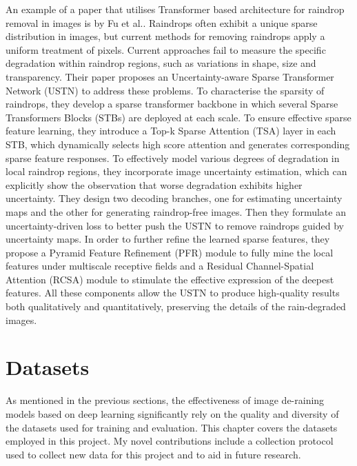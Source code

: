 \documentclass[11pt]{ociamthesis}  %
\begin{document}
An example of a paper that utilises Transformer based architecture for raindrop removal in images is by Fu et al.\cite{fu2024uncertainty}. Raindrops often exhibit a unique sparse distribution in images, but current methods for removing raindrops apply a uniform treatment of pixels. Current approaches fail to measure the specific degradation within raindrop regions, such as variations in shape, size and transparency. Their paper proposes an Uncertainty-aware Sparse Transformer Network (USTN) to address these problems. To characterise the sparsity of raindrops, they develop a sparse transformer backbone in which several Sparse Transformers Blocks\cite{child2019generatinglongsequencessparse} (STBs) are deployed at each scale. To ensure effective sparse feature learning, they introduce a Top-k Sparse Attention (TSA) layer in each STB, which dynamically selects high score attention and generates corresponding sparse feature responses. To effectively model various degrees of degradation in local raindrop regions, they incorporate image uncertainty estimation, which can explicitly show the observation that worse degradation exhibits higher uncertainty. They design two decoding branches, one for estimating uncertainty maps and the other for generating raindrop-free images. Then they formulate an uncertainty-driven loss to better push the USTN to remove raindrops guided by uncertainty maps. In order to further refine the learned sparse features, they propose a Pyramid Feature Refinement (PFR) module to fully mine the local features under multiscale receptive fields and a Residual Channel-Spatial Attention (RCSA) module to stimulate the effective expression of the deepest features. All these components allow the USTN to produce high-quality results both qualitatively and quantitatively, preserving the details of the rain-degraded images. 



\chapter{Datasets}
\label{Chapter:Datasets}

As mentioned in the previous sections, the effectiveness of image de-raining models based on deep learning significantly rely on the quality and diversity of the datasets used for training and evaluation. This chapter covers the datasets employed in this project. My novel contributions include a collection protocol used to collect new data for this project and to aid in future research. 
\end{document}
